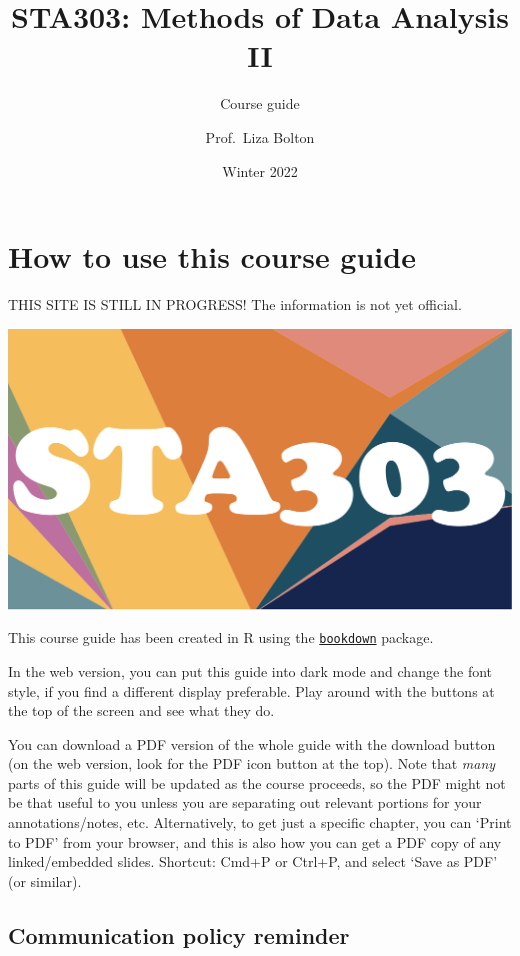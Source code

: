 \documentclass[
  openany]{book}
\title{STA303: Methods of Data Analysis II}
\subtitle{Course guide}
\author{Prof.~Liza Bolton}
\date{Winter 2022}
\begin{document}
\maketitle

{
\hypersetup{linkcolor=}
\setcounter{tocdepth}{1}
\tableofcontents
}
\hypertarget{how-to-use-this-course-guide}{%
\chapter{How to use this course guide}\label{how-to-use-this-course-guide}}

THIS SITE IS STILL IN PROGRESS! The information is not yet official.

\begin{center}\includegraphics[width=0.5\linewidth]{images/quercus-cover} \end{center}

This course guide has been created in R using the \href{https://bookdown.org/}{\texttt{bookdown}} package.

In the web version, you can put this guide into dark mode and change the font style, if you find a different display preferable. Play around with the buttons at the top of the screen and see what they do.

You can download a PDF version of the whole guide with the download button (on the web version, look for the PDF icon button at the top). Note that \emph{many} parts of this guide will be updated as the course proceeds, so the PDF might not be that useful to you unless you are separating out relevant portions for your annotations/notes, etc. Alternatively, to get just a specific chapter, you can `Print to PDF' from your browser, and this is also how you can get a PDF copy of any linked/embedded slides. Shortcut: Cmd+P or Ctrl+P, and select `Save as PDF' (or similar).

\hypertarget{communication-policy-reminder}{%
\section{Communication policy reminder}\label{communication-policy-reminder}}
\end{document}
